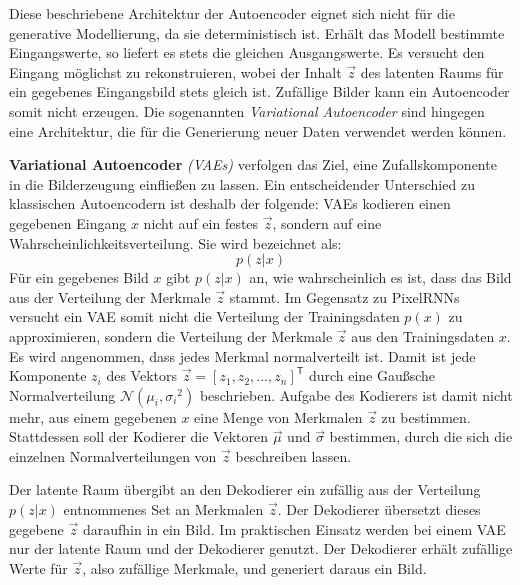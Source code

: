 Diese beschriebene Architektur der Autoencoder eignet sich nicht für die generative Modellierung, da sie deterministisch ist. Erhält das Modell bestimmte Eingangswerte, so liefert es stets die gleichen Ausgangswerte. Es versucht den Eingang möglichst zu rekonstruieren, wobei der Inhalt $\vec{z}$ des latenten Raums für ein gegebenes Eingangsbild stets gleich ist. Zufällige Bilder kann ein Autoencoder somit nicht erzeugen. Die sogenannten \emph{Variational Autoencoder} sind hingegen eine Architektur, die für die Generierung neuer Daten verwendet werden können. \cite{visualApproach} \cite{generativeModelsSurvey}

\textbf{Variational Autoencoder} \emph{(\acsp{VAE})} verfolgen das Ziel, eine Zufallskomponente in die Bilderzeugung einfließen zu lassen. Ein entscheidender Unterschied zu klassischen Autoencodern ist deshalb der folgende: \acsp{VAE} kodieren einen gegebenen Eingang $x$ nicht auf ein festes $\vec{z}$, sondern auf eine Wahrscheinlichkeitsverteilung. Sie wird bezeichnet als: \cite{autoencoders}
\begin{equation}
   p(z|x)
\end{equation}
Für ein gegebenes Bild $x$ gibt $p(z|x)$ an, wie wahrscheinlich es ist, dass das Bild aus der Verteilung der Merkmale $\vec{z}$ stammt.
Im Gegensatz zu \acp{PixelRNN} versucht ein \acs{VAE} somit nicht die Verteilung der Trainingsdaten $p(x)$ zu approximieren, sondern die Verteilung der Merkmale $\vec{z}$ aus den Trainingsdaten $x$.
Es wird angenommen, dass jedes Merkmal normalverteilt ist. Damit ist jede Komponente $z_{i}$ des Vektors $\vec{z} = [z_{1}, z_{2}, ..., z_{n}]^\mathsf{T}$ durch eine Gaußsche Normalverteilung $\mathcal{N}(\mu_{i}, {\sigma_{i}}^{2})$ beschrieben. Aufgabe des Kodierers ist damit nicht mehr, aus einem gegebenen $x$ eine Menge von Merkmalen $\vec{z}$ zu bestimmen. Stattdessen soll der Kodierer die Vektoren $\vec{\mu}$ und $\vec{\sigma}$ bestimmen, durch die sich die einzelnen Normalverteilungen von $\vec{z}$ beschreiben lassen. \cite{generativeModelsSurvey} \cite{autoencoders}

Der latente Raum übergibt an den Dekodierer ein zufällig aus der Verteilung $p(z|x)$ entnommenes Set an Merkmalen $\vec{z}$.
Der Dekodierer übersetzt dieses gegebene $\vec{z}$ daraufhin in ein Bild. Im praktischen Einsatz werden bei einem \acs{VAE} nur der latente Raum und der Dekodierer genutzt. Der Dekodierer erhält zufällige Werte für $\vec{z}$, also zufällige Merkmale, und generiert daraus ein Bild. \cite{autoencoders} \cite{visualApproach}

